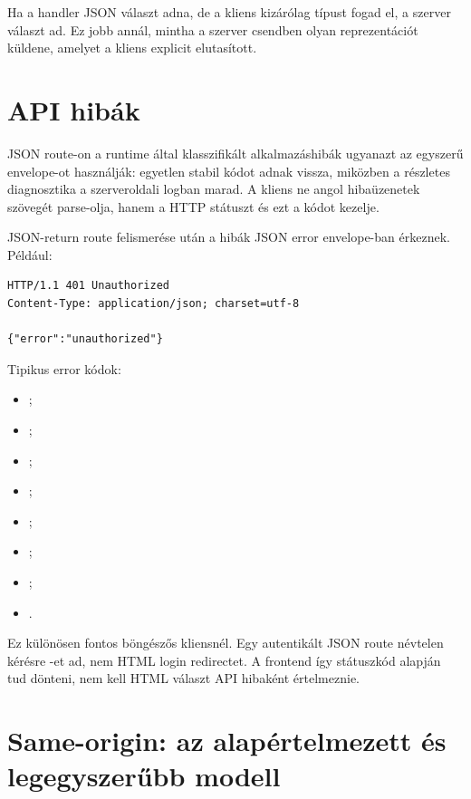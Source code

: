 Ha a handler JSON választ adna, de a kliens kizárólag  típust fogad el, a szerver  választ ad. Ez jobb annál, mintha a szerver csendben olyan reprezentációt küldene, amelyet a kliens explicit elutasított.

\section{API hibák}

JSON route-on a runtime által klasszifikált alkalmazáshibák ugyanazt az egyszerű envelope-ot használják: egyetlen stabil  kódot adnak vissza, miközben a részletes diagnosztika a szerveroldali logban marad. A kliens ne angol hibaüzenetek szövegét parse-olja, hanem a HTTP státuszt és ezt a kódot kezelje.

JSON-return route felismerése után a hibák JSON error envelope-ban érkeznek. Például:

\begin{lstlisting}
HTTP/1.1 401 Unauthorized
Content-Type: application/json; charset=utf-8

{"error":"unauthorized"}
\end{lstlisting}

Tipikus error kódok:

\begin{itemize}
  \item {};
  \item {};
  \item {};
  \item {};
  \item {};
  \item {};
  \item {};
  \item {}.
\end{itemize}

Ez különösen fontos böngészős kliensnél. Egy autentikált JSON route névtelen kérésre -et ad, nem HTML login redirectet. A frontend így státuszkód alapján tud dönteni, nem kell HTML választ API hibaként értelmeznie.

\section{Same-origin: az alapértelmezett és legegyszerűbb modell}

